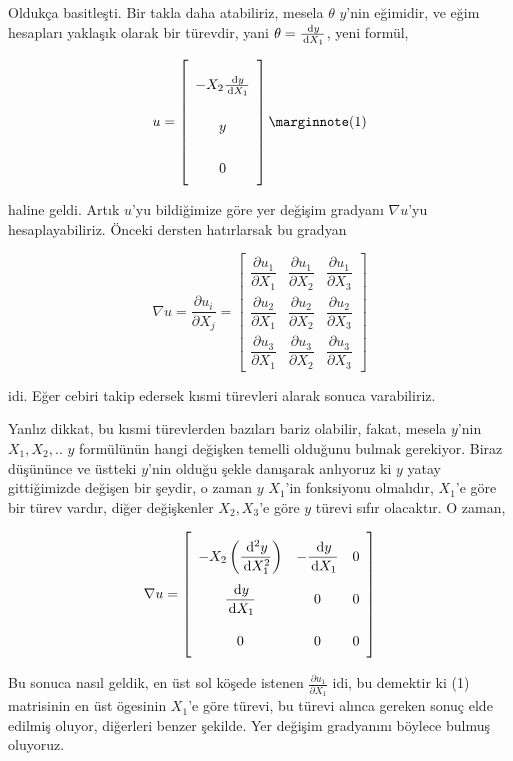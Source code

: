 \documentclass[12pt,fleqn]{article}\usepackage{../../common}
\begin{document}
Oldukça basitleşti. Bir takla daha atabiliriz, mesela $\theta$ $y$'nin eğimidir,
ve eğim hesapları yaklaşık olarak bir türevdir, yani $\theta = \frac{\,\mathrm{d} y}{\,\mathrm{d} X_1}$,
yeni formül,

$$
u = \left[\begin{array}{ccc}
-X_2 \frac{\ud y}{\ud X_1} \\ y \\ 0
\end{array}\right]
\mlabel{1}
$$

haline geldi. Artık $u$'yu bildiğimize göre yer değişim gradyanı $\nabla u$'yu
hesaplayabiliriz. Önceki dersten hatırlarsak bu gradyan

$$
\renewcommand*{\arraystretch}{2.5}
\nabla u = \frac{\partial u_i}{\partial X_j} =
\left[\begin{array}{ccc}
\dfrac{\partial u_1}{\partial X_1} & \dfrac{\partial u_1}{\partial X_2} & \dfrac{\partial u_1}{\partial X_3} \\
\dfrac{\partial u_2}{\partial X_1} & \dfrac{\partial u_2}{\partial X_2} & \dfrac{\partial u_2}{\partial X_3} \\
\dfrac{\partial u_3}{\partial X_1} & \dfrac{\partial u_3}{\partial X_2} & \dfrac{\partial u_3}{\partial X_3} 
\end{array}\right]
$$

idi. Eğer cebiri takip edersek kısmi türevleri alarak sonuca varabiliriz.

Yanlız dikkat, bu kısmi türevlerden bazıları bariz olabilir, fakat, mesela
$y$'nin $X_1,X_2,..$ $y$ formülünün hangi değişken temelli olduğunu bulmak
gerekiyor. Biraz düşününce ve üstteki $y$'nin olduğu şekle danışarak anlıyoruz
ki $y$ yatay gittiğimizde değişen bir şeydir, o zaman $y$ $X_1$'in fonksiyonu
olmalıdır, $X_1$'e göre bir türev vardır, diğer değişkenler $X_2,X_3$'e göre $y$
türevi sıfır olacaktır. O zaman,

$$
\renewcommand*{\arraystretch}{2.5}
\nabla u = \left[\begin{array}{ccc}
-X_2 \left( \dfrac{\ud^2 y}{\ud X_1^2} \right)  & - \dfrac{\ud y}{\ud X_1} & 0 \\ 
\dfrac{\ud y}{\ud X_1} & 0 & 0 \\ 
0 & 0 & 0
\end{array}\right]
$$

Bu sonuca nasıl geldik, en üst sol köşede istenen $\frac{\partial u_1}{\partial X_1}$
idi, bu demektir ki (1) matrisinin en üst ögesinin $X_1$'e göre türevi, bu
türevi alınca gereken sonuç elde edilmiş oluyor, diğerleri benzer şekilde.
Yer değişim gradyanını böylece bulmuş oluyoruz.
\end{document}

